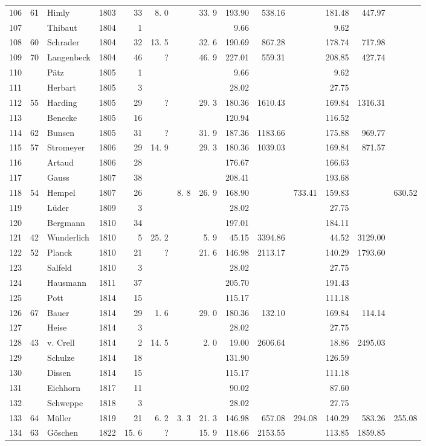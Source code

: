 \begin{center}
\begin{tabular}{|r|r|l|r|r|r|r|r|r|r|r|r|r|r|}
106&61&Himly&1803&33&8. 0&&33. 9&193.90&538.16&&181.48&447.97&\\
107&&Thibaut&1804&1&&&&9.66&&&9.62&&\\
108&60&Schrader&1804&32&13. 5&&32. 6&190.69&867.28&&178.74&717.98&\\
109&70&Langenbeck&1804&46&?&&46. 9&227.01&559.31&&208.85&427.74&\\
110&&Pätz&1805&1&&&&9.66&&&9.62&&\\[3pt]
111&&Herbart&1805&3&&&&28.02&&&27.75&&\\
112&55&Harding&1805&29&?&&29. 3&180.36&1610.43&&169.84&1316.31&\\
113&&Benecke&1805&16&&&&120.94&&&116.52&&\\
114&62&Bunsen&1805&31&?&&31. 9&187.36&1183.66&&175.88&969.77&\\
115&57&Stromeyer&1806&29&14. 9&&29. 3&180.36&1039.03&&169.84&871.57&\\
116&&Artaud&1806&28&&&&176.67&&&166.63&&\\
117&&Gauss&1807&38&&&&208.41&&&193.68&&\\
118&54&Hempel&1807&26&&8. 8&26. 9&168.90&&733.41&159.83&&630.52\\
119&&Lüder&1809&3&&&&28.02&&&27.75&&\\
120&&Bergmann&1810&34&&&&197.01&&&184.11&&\\[3pt]
121&42&Wunderlich&1810&5&25. 2&&5. 9&45.15&3394.86&&44.52&3129.00&\\
122&52&Planck&1810&21&?&&21. 6&146.98&2113.17&&140.29&1793.60&\\
123&&Salfeld&1810&3&&&&28.02&&&27.75&&\\
124&&Hausmann&1811&37&&&&205.70&&&191.43&&\\
125&&Pott&1814&15&&&&115.17&&&111.18&&\\
126&67&Bauer&1814&29&1. 6&&29. 0&180.36&132.10&&169.84&114.14&\\
127&&Heise&1814&3&&&&28.02&&&27.75&&\\
128&43&v. Crell&1814&2&14. 5&&2. 0&19.00&2606.64&&18.86&2495.03&\\
129&&Schulze&1814&18&&&&131.90&&&126.59&&\\
130&&Dissen&1814&15&&&&115.17&&&111.18&&\\[3pt]
131&&Eichhorn&1817&11&&&&90.02&&&87.60&&\\
132&&Schweppe&1818&3&&&&28.02&&&27.75&&\\
133&64&Müller&1819&21&6. 2&3. 3&21. 3&146.98&657.08&294.08&140.29&583.26&255.08\\
134&63&Göschen&1822&15. 6&?&&15. 9&118.66&2153.55&&113.85&1859.85&\\\hline
\end{tabular}
\end{center}
